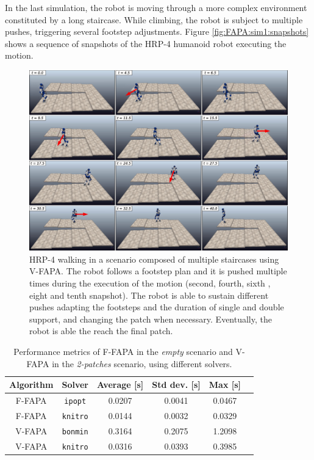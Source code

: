 In the last simulation, the robot is moving through a more complex environment constituted by a long staircase. While climbing, the robot is subject to multiple pushes, triggering several footstep adjustments.  Figure \ref{fig:FAPA:sim1:snapshots} shows a sequence of snapshots of the HRP-4 humanoid robot executing the motion.
\begin{figure}
    \centering
    \includegraphics[width=\textwidth]{figures/staircase-multiple-pushes-snapshots.jpeg}
    \caption{HRP-4 walking in a scenario composed of multiple staircases using V-FAPA. The robot follows a footstep plan and it is pushed multiple times during the execution of the motion (second, fourth, sixth , eight and tenth snapshot). The robot is able to sustain different pushes adapting the footsteps and the duration of single and double support, and changing the patch when necessary. Eventually, the robot is able the reach the final patch.}
    \label{fig:FAPA:sim3:snapshots}
\end{figure}

\begin{table}
    \centering
    \begin{tabular}{*{6}{c}}
        Algorithm & Solver & Average [s] & Std dev. [s] & Max [s] \\
        \hline
        F-FAPA & \texttt{ipopt} & 0.0207 & 0.0041 & 0.0467 \\
        F-FAPA & \texttt{knitro} & 0.0144 & 0.0032 & 0.0329 \\
        V-FAPA & \texttt{bonmin} & 0.3164 & 0.2075 & 1.2098 \\
        V-FAPA & \texttt{knitro} & 0.0316 & 0.0393 & 0.3985
    \end{tabular}
    \caption{Performance metrics of F-FAPA in the {\em empty} scenario and V-FAPA in the {\em 2-patches} scenario, using different solvers.}
    \label{tab:benchmarks}
\end{table}

